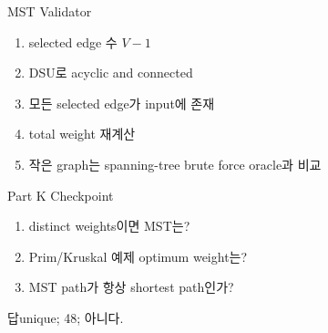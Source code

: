 \begin{frame}{MST Validator}
\begin{enumerate}\item selected edge 수 \(V-1\)\item DSU로 acyclic and connected\item 모든 selected edge가 input에 존재\item total weight 재계산\item 작은 graph는 spanning-tree brute force oracle과 비교\end{enumerate}
\end{frame}
\begin{frame}{Part K Checkpoint}
\begin{enumerate}\item distinct weights이면 MST는?\item Prim/Kruskal 예제 optimum weight는?\item MST path가 항상 shortest path인가?\end{enumerate}
\begin{exampleblock}{답}unique; 48; 아니다.\end{exampleblock}
\end{frame}
